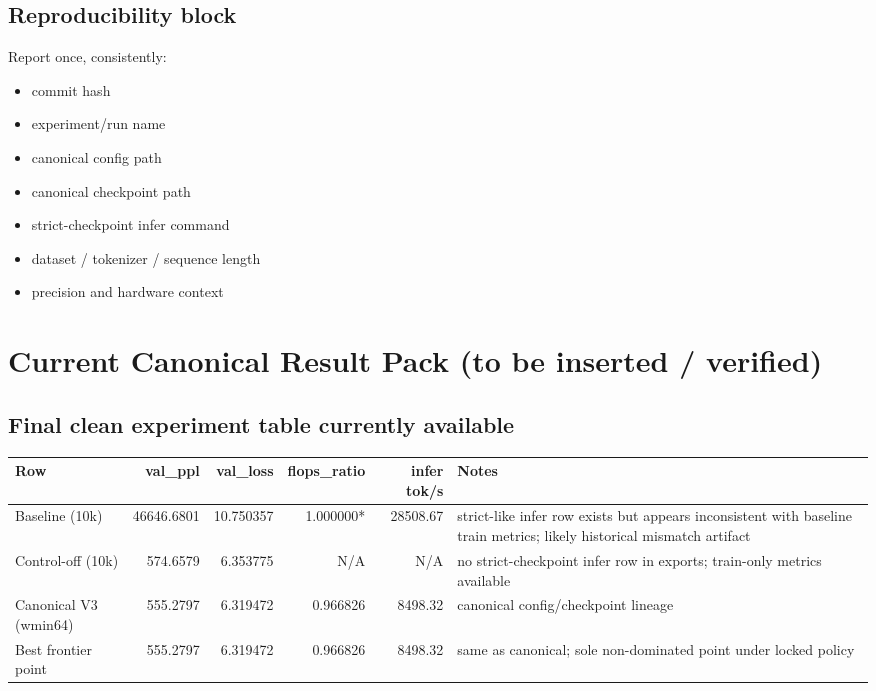 \documentclass[11pt]{article}
\begin{document}
\subsection{Reproducibility block}

Report once, consistently:
\begin{itemize}
\item commit hash
\item experiment/run name
\item canonical config path
\item canonical checkpoint path
\item strict-checkpoint infer command
\item dataset / tokenizer / sequence length
\item precision and hardware context
\end{itemize}



\section{Current Canonical Result Pack (to be inserted / verified)}

\subsection{Final clean experiment table currently available}

\begin{table}[ht]
\small
\setlength{\tabcolsep}{4pt}
\begin{tabularx}{\textwidth}{@{}lrrrrY@{}}
\toprule
Row & val_ppl & val_loss & flops_ratio & infer tok/s & Notes \\
\midrule
Baseline (10k) & 46646.6801 & 10.750357 & 1.000000* & 28508.67 & strict-like infer row exists but appears inconsistent with baseline train metrics; likely historical mismatch artifact \\
Control-off (10k) & 574.6579 & 6.353775 & N/A & N/A & no strict-checkpoint infer row in exports; train-only metrics available \\
Canonical V3 (wmin64) & 555.2797 & 6.319472 & 0.966826 & 8498.32 & canonical config/checkpoint lineage \\
Best frontier point & 555.2797 & 6.319472 & 0.966826 & 8498.32 & same as canonical; sole non-dominated point under locked policy \\
\bottomrule
\end{tabularx}
\end{table}
\end{document}
